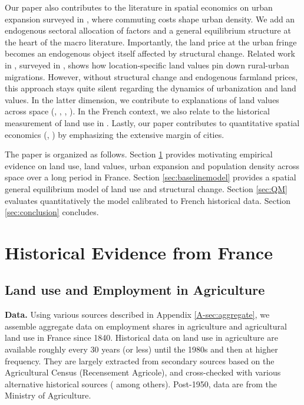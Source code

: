 \documentclass[./20250130-paper.tex]{subfiles}
\begin{document}
	Our paper also contributes to the literature in spatial economics on urban expansion surveyed in \cite{duranton2014growth,duranton2015urban}, where commuting costs shape urban density. We add an endogenous sectoral allocation of factors and a general equilibrium structure at the heart of the macro literature. Importantly, the land price at the urban fringe becomes an endogenous object itself affected by structural change. Related work in \cite{brueckner1990analyzing}, surveyed in \cite{bruecknerLall}, shows how location-specific land values pin down rural-urban migrations. However, without structural change and endogenous farmland prices, this approach stays quite silent regarding the dynamics of urbanization and land values. In the latter dimension, we contribute to explanations of land values across space (\cite{glaeser2005manhattan}, \cite{albouy2016cities}, \cite{albouyehrlichshin2018}, \cite{combes2018costs}). In the French context, we also relate to the historical measurement of land use in \cite{combesetal2021}.  Lastly, our paper contributes to quantitative spatial economics (\cite{ahlfeldt2015economics}, \cite{redding2017quantitative}) by emphasizing the extensive margin of cities.
	
	
	The paper is organized as follows. Section \ref{sec:empevidence} provides motivating empirical evidence on land use, land values, urban expansion and population density across space over a long period in France. Section \ref{sec:baselinemodel} provides a spatial general equilibrium model of land use and structural change. Section \ref{sec:QM} evaluates quantitatively the model calibrated to French historical data. Section \ref{sec:conclusion} concludes.
	

\section{Historical Evidence from France}\label{sec:empevidence}



\subsection{Land use and Employment in Agriculture}
\textbf{Data.} Using various sources described in Appendix \ref{A-sec:aggregate}, we assemble aggregate data on employment shares in agriculture and agricultural land use in France since 1840. Historical data on land use in agriculture are available roughly every 30 years (or less) until the 1980s and then at higher frequency. They are largely extracted from secondary sources based on the Agricultural Census (Recensement Agricole), and cross-checked with various alternative historical sources (\cite{toutain1993production} among others). Post-1950, data are from the Ministry of Agriculture.
\end{document}
